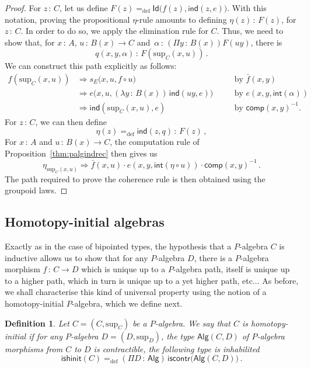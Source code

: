 \documentclass[10pt,a4paper,oneside,reqno]{amsart}
\numberwithin{equation}{section}
\theoremstyle{mythm}
\theoremstyle{mydef}
\newtheorem{definition}[theorem]{Definition}
\theoremstyle{myrmk}
\newcommand{\ie}{\text{i.e.\ }}
\newcommand{\by}[1]{\quad&&\text{by {$#1$}}}
\newcommand{\defeq}{=_{\mathrm{def}}}
\newcommand{\co}{\,{:}\,}
\newcommand{\iscontr}{\mathsf{iscontr}}
\newcommand{\isalghinit}{\mathsf{ishinit}}
\renewcommand{\int}{\mathsf{int}}
\newcommand{\Id}{\mathsf{Id}}
\newcommand{\ind}{\mathsf{ind}}
\newcommand{\comp}{\mathsf{comp}}
\newcommand{\Palg}{\mathsf{Alg}}
\renewcommand{\sup}{\mathrm{sup}}
\begin{document}
\begin{proof} For $z \co C$, let us define $F(z) \defeq \Id \big(   f(z), \ind(z,e))$. With this notation, proving
 the propositional $\eta$-rule amounts to defining $\eta(z) \co F(z)$, for $z \co C$. In order to do so, we apply
the elimination rule for $C$. Thus, we need to show that, for $x \co A$, $u \co B(x) \to C$ and~$\alpha \co 
(\Pi y \co B(x)) F(uy)$, there 
is 
\[
q(x,y,\alpha) \co   F(\sup_C(x,u)) \, .
\]
We can construct this path explicitly as follows:
\begin{align*}
f(\sup_C(x,u)) &\Rightarrow s_E\big(x,u , f \circ u \big)   \by{\bar{f}(x,y)}\\
	&\Rightarrow e\big(x,u, (\lambda y \co B(x) )\, \ind(u y ,e) \big) \by{e(x,y,\int(\alpha))}\\
	& \Rightarrow \ind(\sup_C(x,u),e) \by{\comp(x,y)^{-1}}.
\end{align*}
For $z \co C$, we can then define
\[
\eta(z) \defeq \ind(z,q) \co F(z) \, ,
\] 
For $x \co A$ and $u \co B(x) \to C$, the  computation rule of Proposition~\ref{thm:palgindrec} then gives us
\[
 \eta_{\sup_C(x,u)} \Rightarrow  \bar{f}(x,u) \cdot e(x,y,\int(  \eta \circ u ))  \cdot  \comp(x,y)^{-1} \, .
\]
The path required to prove  the coherence rule is then obtained using the groupoid laws.
\end{proof}


\subsection{Homotopy-initial algebras}
Exactly as in the case of bipointed types, the hypothesis that a $P$-algebra $C$ is inductive allows us to show that for any
$P$-algebra $D$, there is a $P$-algebra morphism $f \co C \to D$ which is unique up to a $P$-algebra path, itself is unique up 
to a higher path, which in turn is unique up to a yet higher path, etc... As before, we shall characterise this kind of universal property
using the notion of a homotopy-initial $P$-algebra, which we define next.

\begin{definition}\label{def:AlgInit}
Let $C = (C, \sup_C)$ be a $P$-algebra. We say that $C$ is  \emph{homotopy-initial}  if for any $P$-algebra 
$D = (D, \sup_D)$, the type $\Palg(C,D)$ of $P$-algebra morphisms from $C$ to $D$
is contractible, \ie the following type is inhabilited
\[
\isalghinit(C) \defeq
 (\Pi D \co \Palg)  \, \iscontr \big( \Palg(C,D) \big)  \, .
\]  
\end{definition}
\end{document}
